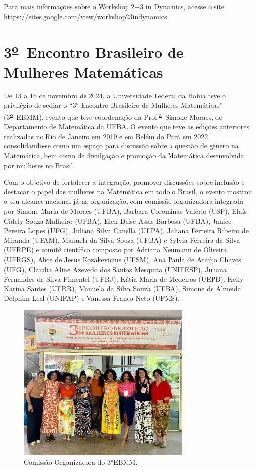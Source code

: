 \documentclass{hipatia}
\newcommand{\superau}{\textsuperscript{\underline{a}}~}
\newcommand{\superou}{\textsuperscript{\underline{o}}~}
\begin{document}
Para mais informações sobre o Workshop 2+3 in Dynamics, acesse o site
\href{https://sites.google.com/view/workshop23indynamics}{https://sites.google.com/view/workshop23indynamics}.


\section{3\superou Encontro Brasileiro de Mulheres Matemáticas }

De 13 a 16 de novembro de 2024, a Universidade Federal da Bahia teve o privilégio de sediar o ``3° Encontro Brasileiro de Mulheres Matemáticas'' (3\superou EBMM), evento que teve coordenação da Prof.\superau Simone Moraes, do Departamento de Matemática da UFBA.
O evento que teve as edições anteriores realizadas no Rio de Janeiro em 2019 e em Belém do Pará em 2022, consolidando-se como um espaço para discussão sobre a questão de gênero na Matemática, bem como de divulgação e promoção da Matemática desenvolvida por mulheres no Brasil.

Com o objetivo de fortalecer a integração, promover discussões sobre inclusão e destacar o papel das mulheres na Matemática em todo o Brasil, o evento mostrou o seu alcance nacional já na organização, com comissão organizadora integrada por Simone Maria de Moraes (UFBA), Barbara Corominas Valério (USP), Elaís Cidely Souza Malheiro (UFBA), Elen Deise Assis Barbosa (UFBA), Janice Pereira Lopes (UFG), Juliana Silva Canella (UFPA), Juliana Ferreira Ribeiro de Miranda (UFAM), Manuela da Silva Souza (UFBA) e Sylvia Ferreira da Silva (UFRPE) e comitê científico composto por Adriana Neumann de Oliveira (UFRGS), Alice de Jesus Kozakevicius (UFSM), Ana Paula de Araújo Chaves (UFG), Cláudia Aline Azevedo dos Santos Mesquita (UNIFESP), Juliana Fernandes da Silva Pimentel (UFRJ), Kátia Maria de Medeiros (UEPB), Kelly Karina Santos (UFRR), Manuela da Silva Souza (UFBA), Simone de Almeida Delphim Leal (UNIFAP) e Vanessa Franco Neto (UFMS).

\begin{figure}[htb]
    \centering
    \includegraphics[width=8.5cm]{EBMM3.jpg}
    \caption{Comissão Organizadora do 3°EBMM.}
 \label{EBMM3}
\end{figure}
\end{document}
